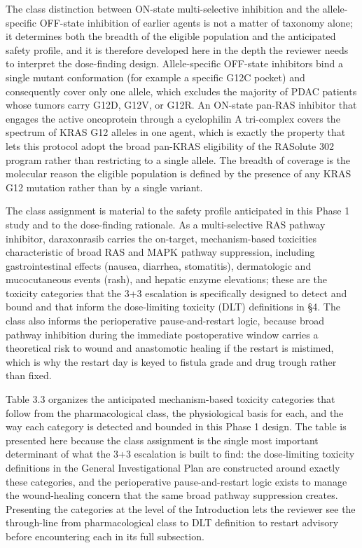 The class distinction between ON-state multi-selective inhibition and the
allele-specific OFF-state inhibition of earlier agents is not a matter of taxonomy
alone; it determines both the breadth of the eligible population and the anticipated
safety profile, and it is therefore developed here in the depth the reviewer needs
to interpret the dose-finding design. Allele-specific OFF-state inhibitors bind a
single mutant conformation (for example a specific G12C pocket) and consequently
cover only one allele, which excludes the majority of PDAC patients whose tumors
carry G12D, G12V, or G12R. An ON-state pan-RAS inhibitor that engages the active
oncoprotein through a cyclophilin A tri-complex covers the spectrum of KRAS G12
alleles in one agent, which is exactly the property that lets this protocol adopt the
broad pan-KRAS eligibility of the RASolute 302 program rather than restricting to a
single allele. The breadth of coverage is the molecular reason the eligible
population is defined by the presence of any KRAS G12 mutation rather than by a
single variant.

The class assignment is material to the safety profile anticipated in this Phase 1
study and to the dose-finding rationale. As a multi-selective RAS pathway
inhibitor, daraxonrasib carries the on-target, mechanism-based toxicities
characteristic of broad RAS and MAPK pathway suppression, including
gastrointestinal effects (nausea, diarrhea, stomatitis), dermatologic and
mucocutaneous events (rash), and hepatic enzyme elevations; these are the toxicity
categories that the 3+3 escalation is specifically designed to detect and bound and
that inform the dose-limiting toxicity (DLT) definitions in \S 4. The class also
informs the perioperative pause-and-restart logic, because broad pathway inhibition
during the immediate postoperative window carries a theoretical risk to wound and
anastomotic healing if the restart is mistimed, which is why the restart day is
keyed to fistula grade and drug trough rather than fixed.

Table 3.3 organizes the anticipated mechanism-based toxicity categories that follow
from the pharmacological class, the physiological basis for each, and the way each
category is detected and bounded in this Phase 1 design. The table is presented here
because the class assignment is the single most important determinant of what the
3+3 escalation is built to find: the dose-limiting toxicity definitions in the
General Investigational Plan are constructed around exactly these categories, and the
perioperative pause-and-restart logic exists to manage the wound-healing concern that
the same broad pathway suppression creates. Presenting the categories at the level of
the Introduction lets the reviewer see the through-line from pharmacological class to
DLT definition to restart advisory before encountering each in its full subsection.

